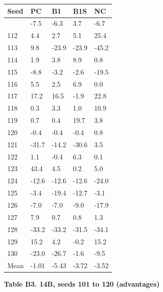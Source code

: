 \documentclass[11pt]{article}
\begin{document}
{\def\LTcaptype{none} %
\begin{longtable}[]{@{}lllll@{}}
\toprule\noalign{}
Seed & PC & B1 & B1S & NC \\
\midrule\noalign{}
\endhead
\bottomrule\noalign{}
\endlastfoot
111 & -7.5 & -6.3 & 3.7 & -6.7 \\
112 & 4.4 & 2.7 & 5.1 & 25.4 \\
113 & 9.8 & -23.9 & -23.9 & -45.2 \\
114 & 1.9 & 3.8 & 8.9 & 0.8 \\
115 & -8.8 & -3.2 & -2.6 & -19.5 \\
116 & 5.5 & 2.5 & 6.9 & 0.0 \\
117 & 17.2 & 16.5 & -1.9 & 22.8 \\
118 & 0.3 & 3.3 & 1.0 & 10.9 \\
119 & 0.7 & 0.4 & 19.7 & 3.8 \\
120 & -0.4 & -0.4 & -0.4 & 0.8 \\
121 & -31.7 & -14.2 & -30.6 & 3.5 \\
122 & 1.1 & -0.4 & 6.3 & 0.1 \\
123 & 43.4 & 4.5 & 0.2 & 5.0 \\
124 & -12.6 & -12.6 & -12.6 & -24.0 \\
125 & -3.4 & -19.4 & -12.7 & -3.1 \\
126 & -7.0 & -7.0 & -9.0 & -17.9 \\
127 & 7.9 & 0.7 & 0.8 & 1.3 \\
128 & -33.2 & -33.2 & -31.5 & -34.1 \\
129 & 15.2 & 4.2 & -0.2 & 15.2 \\
130 & -23.0 & -26.7 & -1.6 & -9.5 \\
Mean & -1.01 & -5.43 & -3.72 & -3.52 \\
\end{longtable}
}

\textbf{Table B3. 14B, seeds 101 to 120 (advantages)}
\end{document}
